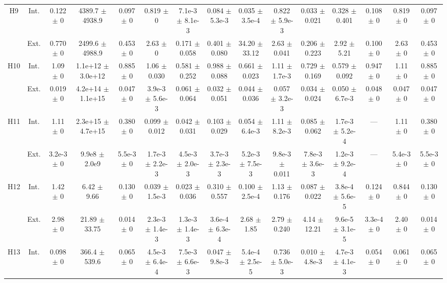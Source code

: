 \begin{table}[htbp]
{\begin{tabular}{@{}ccccccccccccccc@{}}
\cline{2-15}
\multirow{2}{*}{H9} & Int. & 0.122 $\pm$ 0 & 4389.7 $\pm$ 4938.9 & 0.097 $\pm$ 0 & 0.819 $\pm$ 0 & 7.1e-3 $\pm$ 8.1e-3 & 0.084 $\pm$ 5.3e-3 & 0.035 $\pm$ 3.5e-4 & 0.822 $\pm$ 5.9e-3 & 0.033 $\pm$ 0.021 & 0.328 $\pm$ 0.401 & 0.108 $\pm$ 0 & 0.819 $\pm$ 0 & 0.097 $\pm$ 0 \\
 & Ext. & 0.770 $\pm$ 0 & 2499.6 $\pm$ 4988.9 & 0.453 $\pm$ 0 & 2.63 $\pm$ 0 & 0.171 $\pm$ 0.058 & 0.401 $\pm$ 0.080 & 34.20 $\pm$ 33.12 & 2.63 $\pm$ 0.041 & 0.206 $\pm$ 0.223 & 2.92 $\pm$ 5.21 & 0.100 $\pm$ 0 & 2.63 $\pm$ 0 & 0.453 $\pm$ 0 \\
\cline{2-15}
\multirow{2}{*}{H10} & Int. & 1.09 $\pm$ 0 & 1.1e+12 $\pm$ 3.0e+12 & 0.885 $\pm$ 0 & 1.06 $\pm$ 0.030 & 0.581 $\pm$ 0.252 & 0.988 $\pm$ 0.088 & 0.661 $\pm$ 0.023 & 1.11 $\pm$ 1.7e-3 & 0.729 $\pm$ 0.169 & 0.579 $\pm$ 0.092 & 0.947 $\pm$ 0 & 1.11 $\pm$ 0 & 0.885 $\pm$ 0 \\
 & Ext. & 0.019 $\pm$ 0 & 4.2e+14 $\pm$ 1.1e+15 & 0.047 $\pm$ 0 & 3.9e-3 $\pm$ 5.6e-3 & 0.061 $\pm$ 0.064 & 0.032 $\pm$ 0.051 & 0.044 $\pm$ 0.036 & 0.057 $\pm$ 3.2e-3 & 0.034 $\pm$ 0.024 & 0.050 $\pm$ 6.7e-3 & 0.048 $\pm$ 0 & 0.047 $\pm$ 0 & 0.047 $\pm$ 0 \\
\cline{2-15}
\multirow{2}{*}{H11} & Int. & 1.11 $\pm$ 0 & 2.3e+15 $\pm$ 4.7e+15 & 0.380 $\pm$ 0 & 0.099 $\pm$ 0.012 & 0.042 $\pm$ 0.031 & 0.103 $\pm$ 0.029 & 0.054 $\pm$ 6.4e-3 & 1.11 $\pm$ 8.2e-3 & 0.085 $\pm$ 0.062 & 1.7e-3 $\pm$ 5.2e-4 & --- & 1.11 $\pm$ 0 & 0.380 $\pm$ 0 \\
 & Ext. & 3.2e-3 $\pm$ 0 & 9.9e8 $\pm$ 2.0e9 & 5.5e-3 $\pm$ 0 & 1.7e-3 $\pm$ 2.2e-3 & 4.5e-3 $\pm$ 2.0e-3 & 3.7e-3 $\pm$ 2.3e-3 & 5.2e-3 $\pm$ 7.5e-3 & 9.8e-3 $\pm$ 0.011 & 7.8e-3 $\pm$ 3.6e-3 & 1.2e-3 $\pm$ 9.2e-4 & --- & 5.4e-3 $\pm$ 0 & 5.5e-3 $\pm$ 0 \\
\cline{2-15}
\multirow{2}{*}{H12} & Int. & 1.42 $\pm$ 0 & 6.42 $\pm$ 9.66 & 0.130 $\pm$ 0 & 0.039 $\pm$ 1.5e-3 & 0.023 $\pm$ 0.036 & 0.310 $\pm$ 0.557 & 0.100 $\pm$ 2.5e-4 & 1.13 $\pm$ 0.176 & 0.087 $\pm$ 0.022 & 3.8e-4 $\pm$ 5.6e-5 & 0.124 $\pm$ 0 & 0.844 $\pm$ 0 & 0.130 $\pm$ 0 \\
 & Ext. & 2.98 $\pm$ 0 & 21.89 $\pm$ 33.75 & 0.014 $\pm$ 0 & 2.3e-3 $\pm$ 1.4e-3 & 1.3e-3 $\pm$ 1.4e-3 & 3.6e-4 $\pm$ 6.3e-4 & 2.68 $\pm$ 1.85 & 2.79 $\pm$ 0.240 & 4.14 $\pm$ 12.21 & 9.6e-5 $\pm$ 3.1e-5 & 3.3e-4 $\pm$ 0 & 2.40 $\pm$ 0 & 0.014 $\pm$ 0 \\
\cline{2-15}
\multirow{2}{*}{H13} & Int. & 0.098 $\pm$ 0 & 366.4 $\pm$ 539.6 & 0.065 $\pm$ 0 & 4.5e-3 $\pm$ 6.4e-4 & 7.5e-3 $\pm$ 6.6e-3 & 0.047 $\pm$ 9.8e-3 & 5.4e-4 $\pm$ 2.5e-5 & 0.736 $\pm$ 5.0e-3 & 0.010 $\pm$ 4.8e-3 & 4.7e-3 $\pm$ 4.1e-3 & 0.054 $\pm$ 0 & 0.061 $\pm$ 0 & 0.065 $\pm$ 0 \\

\end{tabular}}
\end{table}
